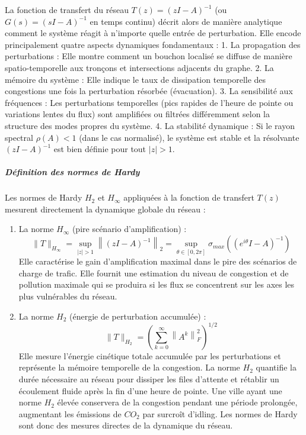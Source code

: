 \documentclass[10pt, a4paper]{article}
\begin{document}
La fonction de transfert du réseau \(T(z) = (zI - A)^{-1}\) (ou
\(G(s) = (sI - A)^{-1}\) en temps continu) décrit alors de manière
analytique comment le système réagit à n'importe quelle entrée de
perturbation. Elle encode principalement quatre aspects dynamiques
fondamentaux : 1. La propagation des perturbations : Elle montre comment
un bouchon localisé se diffuse de manière spatio-temporelle aux tronçons
et intersections adjacents du graphe. 2. La mémoire du système : Elle
indique le taux de dissipation temporelle des congestions une fois la
perturbation résorbée (évacuation). 3. La sensibilité aux fréquences :
Les perturbations temporelles (pics rapides de l'heure de pointe ou
variations lentes du flux) sont amplifiées ou filtrées différemment
selon la structure des modes propres du système. 4. La stabilité
dynamique : Si le rayon spectral \(\rho(A) < 1\) (dans le cas
normalisé), le système est stable et la résolvante \((zI - A)^{-1}\) est
bien définie pour tout \(|z| > 1\).

\subparagraph{Définition des normes de
Hardy}\label{duxe9finition-des-normes-de-hardy}

Les normes de Hardy \(H_2\) et \(H_\infty\) appliquées à la fonction de
transfert \(T(z)\) mesurent directement la dynamique globale du réseau :

\begin{enumerate}
\def\labelenumi{\arabic{enumi}.}
\item
  La norme \(H_\infty\) (pire scénario d'amplification) :
  \[\|T\|_{H_\infty} = \sup_{|z| > 1} \left\| (zI - A)^{-1} \right\|_2 = \sup_{\theta \in [0, 2\pi]} \sigma_{max}\left( (e^{i\theta}I - A)^{-1} \right)\]
  Elle caractérise le gain d'amplification maximal dans le pire des
  scénarios de charge de trafic. Elle fournit une estimation du niveau
  de congestion et de pollution maximale qui se produira si les flux se
  concentrent sur les axes les plus vulnérables du réseau.
\item
  La norme \(H_2\) (énergie de perturbation accumulée) :
  \[\|T\|_{H_2} = \left( \sum_{k=0}^{\infty} \left\| A^k \right\|_F^2 \right)^{1/2}\]
  Elle mesure l'énergie cinétique totale accumulée par les perturbations
  et représente la mémoire temporelle de la congestion. La norme \(H_2\)
  quantifie la durée nécessaire au réseau pour dissiper les files
  d'attente et rétablir un écoulement fluide après la fin d'une heure de
  pointe. Une ville ayant une norme \(H_2\) élevée conservera de la
  congestion pendant une période prolongée, augmentant les émissions de
  \(CO_2\) par surcroît d'idling. Les normes de Hardy sont donc des
  mesures directes de la dynamique du réseau.
\end{enumerate}
\end{document}

